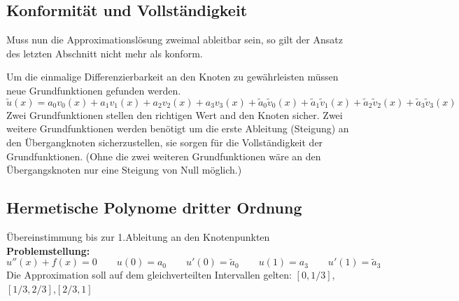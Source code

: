 \subsection{Konformität und Vollständigkeit}
Muss nun die Approximationslösung zweimal ableitbar sein, so gilt der Ansatz des letzten Abschnitt nicht mehr als konform.

Um die einmalige Differenzierbarkeit an den Knoten zu gewährleisten müssen neue Grundfunktionen gefunden werden.\\

$\tilde{u}(x)=a_0v_0(x)+a_1v_1(x)+a_2v_2(x)+a_3v_3(x)+\tilde{a}_0\tilde{v}_0(x)+\tilde{a}_1\tilde{v}_1(x)+\tilde{a}_2\tilde{v}_2(x)+\tilde{a}_3\tilde{v}_3(x)$\\

Zwei Grundfunktionen stellen den richtigen Wert and den Knoten sicher. Zwei weitere Grundfunktionen werden benötigt um die erste Ableitung (Steigung) an den Übergangknoten sicherzustellen, sie sorgen für die Vollständigkeit der Grundfunktionen. (Ohne die zwei weiteren Grundfunktionen wäre an den Übergangsknoten nur eine Steigung von Null möglich.)

\subsection{Hermetische Polynome dritter Ordnung}
Übereinstimmung bis zur 1.Ableitung an den Knotenpunkten\\

\textbf{Problemstellung:} $u''(x)+f(x)=0\qquad u(0)=a_0\qquad u'(0)=\tilde{a}_0 \qquad u(1)=a_3\qquad  u'(1)=\tilde{a}_3$\\

Die Approximation soll auf dem gleichverteilten Intervallen gelten: $[0,1/3]$,\quad $[1/3,2/3]$,\quad $[2/3,1]$\\

